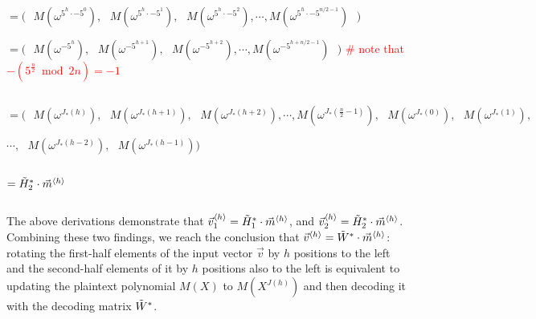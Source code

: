 $= \bm{(} \text{ } M(\omega^{5^h\cdot -5^0}), \text{ } M(\omega^{5^h\cdot -5^1}), \text{ } M(\omega^{5^h\cdot -5^2}), \cdots, M(\omega^{5^h\cdot -5^{n/2-1}}) \text{ } \bm{)}$

$= \bm{(} \text{ } M(\omega^{-5^{h}}), \text{ } M(\omega^{-5^{h+1}}), \text{ } M(\omega^{-5^{h+2}}), \cdots, M(\omega^{-5^{h+n/2-1}}) \text{ } \bm{)}$ \textcolor{red}{ \# note that $-(5^{\frac{n}{2}} \bmod 2n) = -1$}

$ $

$= \bm{(} \text{ } M(\omega^{J_*(h)}), \text{ } M(\omega^{J_*(h+1)}), \text{ } M(\omega^{J_*(h+2)}), \cdots, M(\omega^{J_*(\frac{n}{2}-1)}), \text{ } M(\omega^{J_*(0)}), \text{ }M(\omega^{J_*(1)}),$ 
                                    
$\cdots, \text{ } M(\omega^{J_*(h-2)}), \text{ } M(\omega^{J_*(h-1)})  \bm{)}$ 

$ $

$= \tilde{H}_2^{*}\cdot \vec{m}^{\langle h \rangle}$


$ $

The above derivations demonstrate that $\vec{v}_1^{\langle h \rangle} = \tilde{H}_1^{*}\cdot \vec{m}^{\langle h \rangle}$, and $\vec{v}_2^{\langle h \rangle} = \tilde{H}_2^{*}\cdot \vec{m}^{\langle h \rangle}$. Combining these two findings, we reach the conclusion that $\vec{v}^{\langle h \rangle} = \tilde{W}^* \cdot \vec{m}^{\langle h \rangle}$: rotating the first-half elements of the input vector $\vec{v}$ by $h$ positions to the left and the second-half elements of it by $h$ positions also to the left is equivalent to updating the plaintext polynomial $M(X)$ to $M(X^{J(h)})$ and then decoding it with the decoding matrix $\tilde{W}^*$. 

